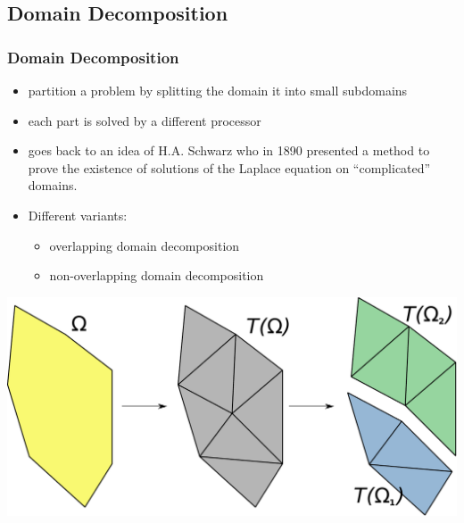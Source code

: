 \subsection{Domain Decomposition}
\begin{frame}
  \frametitle<presentation>{Domain Decomposition}

  \begin{itemize}
  \item partition a problem by splitting the domain it into small subdomains
  \item each part is solved by a different processor
  \item goes back to an idea of H.A. Schwarz who in 1890 presented a method to prove the existence of
        solutions of the Laplace equation on ``complicated'' domains.
  \item Different variants:
    \begin{itemize}
    \item overlapping domain decomposition
    \item non-overlapping domain decomposition
    \end{itemize}
  \end{itemize}
  
  \begin{center}
    \includegraphics[width=.6\linewidth]{EPS/dd}
  \end{center}

\end{frame}

